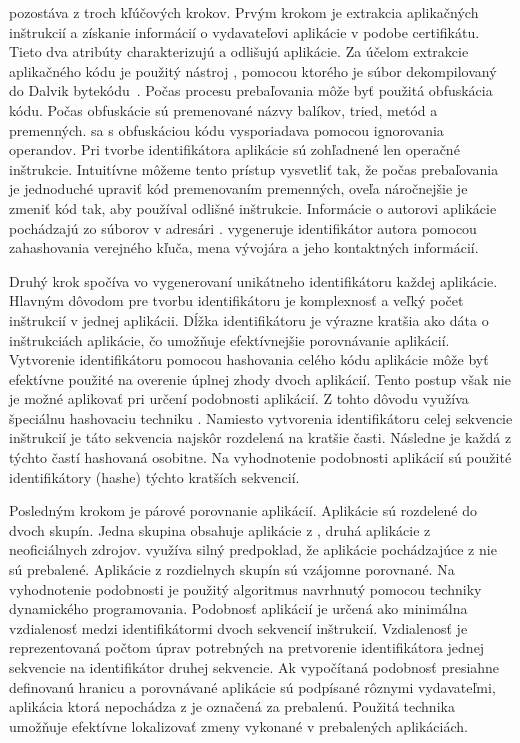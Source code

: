  pozostáva z troch kľúčových krokov. Prvým krokom je extrakcia aplikačných inštrukcií a získanie informácií o vydavateľovi aplikácie v podobe certifikátu. Tieto dva atribúty charakterizujú a odlišujú aplikácie.
Za účelom extrakcie aplikačného kódu je použitý nástroj , pomocou ktorého je súbor  dekompilovaný do Dalvik bytekódu~\cite{smali}.  Počas procesu prebaľovania môže byť použitá obfuskácia kódu. Počas obfuskácie sú premenované názvy balíkov, tried, metód a premenných.  sa s obfuskáciou kódu vysporiadava pomocou ignorovania operandov. Pri tvorbe identifikátora aplikácie sú zohľadnené len operačné inštrukcie. Intuitívne môžeme tento prístup vysvetliť tak, že počas prebaľovania je jednoduché upraviť kód premenovaním premenných, oveľa náročnejšie je zmeniť kód tak, aby používal odlišné inštrukcie. 
Informácie o autorovi aplikácie pochádzajú zo súborov v adresári .  vygeneruje identifikátor autora pomocou zahashovania verejného kľuča, mena vývojára a jeho kontaktných informácií. 

Druhý krok spočíva vo vygenerovaní unikátneho identifikátoru každej aplikácie. Hlavným dôvodom pre tvorbu identifikátoru je komplexnosť a veľký počet inštrukcií v jednej aplikácii. Dĺžka identifikátoru je výrazne kratšia ako dáta o inštrukciách aplikácie, čo umožňuje efektívnejšie porovnávanie aplikácií. 
Vytvorenie identifikátoru pomocou hashovania celého kódu aplikácie môže byť efektívne použité na overenie úplnej zhody dvoch aplikácií. Tento postup však nie je možné aplikovať pri určení podobnosti aplikácií.  Z tohto dôvodu využíva  špeciálnu hashovaciu techniku  \cite{fuzzyHashing}. Namiesto vytvorenia identifikátoru celej sekvencie inštrukcií je táto sekvencia najskôr rozdelená na kratšie časti. Následne je každá z týchto častí hashovaná osobitne. Na vyhodnotenie podobnosti aplikácií sú použité identifikátory (hashe) týchto kratších sekvencií.

Posledným krokom je párové porovnanie aplikácií. Aplikácie sú  rozdelené do dvoch skupín. Jedna skupina obsahuje aplikácie z , druhá aplikácie z neoficiálnych zdrojov.   využíva silný predpoklad, že aplikácie pochádzajúce z  nie sú prebalené. 
Aplikácie z rozdielnych skupín sú vzájomne porovnané. Na vyhodnotenie podobnosti je použitý algoritmus navrhnutý pomocou techniky dynamického programovania. Podobnosť aplikácií je určená ako minimálna vzdialenosť medzi identifikátormi dvoch sekvencií inštrukcií.  Vzdialenosť je reprezentovaná počtom úprav potrebných na pretvorenie identifikátora jednej sekvencie na identifikátor druhej sekvencie. Ak vypočítaná podobnosť presiahne definovanú hranicu a porovnávané aplikácie sú podpísané rôznymi vydavateľmi, aplikácia ktorá nepochádza z  je označená za prebalenú. Použitá technika umožňuje efektívne lokalizovať zmeny vykonané v prebalených aplikáciách. 

